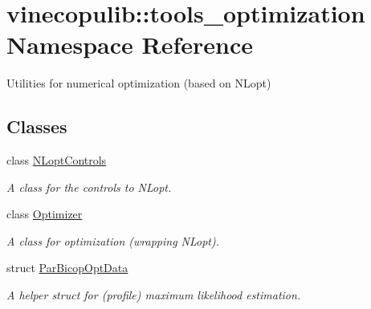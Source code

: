 \hypertarget{namespacevinecopulib_1_1tools__optimization}{}\section{vinecopulib\+:\+:tools\+\_\+optimization Namespace Reference}
\label{namespacevinecopulib_1_1tools__optimization}


Utilities for numerical optimization (based on N\+Lopt)  


\subsection*{Classes}
\begin{DoxyCompactItemize}
\item 
class \hyperlink{classvinecopulib_1_1tools__optimization_1_1_n_lopt_controls}{N\+Lopt\+Controls}
\begin{DoxyCompactList}\small\item\em A class for the controls to N\+Lopt. \end{DoxyCompactList}\item 
class \hyperlink{classvinecopulib_1_1tools__optimization_1_1_optimizer}{Optimizer}
\begin{DoxyCompactList}\small\item\em A class for optimization (wrapping N\+Lopt). \end{DoxyCompactList}\item 
struct \hyperlink{structvinecopulib_1_1tools__optimization_1_1_par_bicop_opt_data}{Par\+Bicop\+Opt\+Data}
\begin{DoxyCompactList}\small\item\em A helper struct for (profile) maximum likelihood estimation. \end{DoxyCompactList}\end{DoxyCompactItemize}
